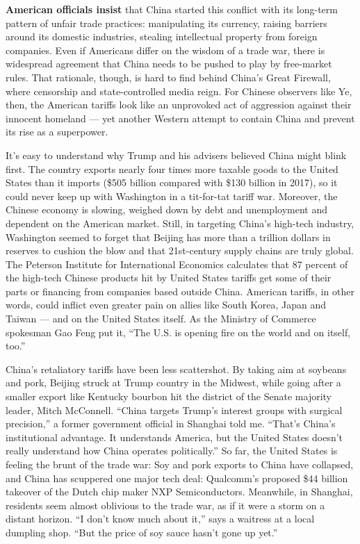\textbf{American officials insist} that China started this conflict with
its long-term pattern of unfair trade practices: manipulating its
currency, raising barriers around its domestic industries, stealing
intellectual property from foreign companies. Even if Americans differ
on the wisdom of a trade war, there is widespread agreement that China
needs to be pushed to play by free-market rules. That rationale, though,
is hard to find behind China's Great Firewall, where censorship and
state-controlled media reign. For Chinese observers like Ye, then, the
American tariffs look like an unprovoked act of aggression against their
innocent homeland --- yet another Western attempt to contain China and
prevent its rise as a superpower.

It's easy to understand why Trump and his advisers believed China might
blink first. The country exports nearly four times more taxable goods to
the United States than it imports (\$505 billion compared with \$130
billion in 2017), so it could never keep up with Washington in a
tit-for-tat tariff war. Moreover, the Chinese economy is slowing,
weighed down by debt and unemployment and dependent on the American
market. Still, in targeting China's high-tech industry, Washington
seemed to forget that Beijing has more than a trillion dollars in
reserves to cushion the blow and that 21st-century supply chains are
truly global. The Peterson Institute for International Economics
calculates that 87 percent of the high-tech Chinese products hit by
United States tariffs get some of their parts or financing from
companies based outside China. American tariffs, in other words, could
inflict even greater pain on allies like South Korea, Japan and Taiwan
--- and on the United States itself. As the Ministry of Commerce
spokesman Gao Feng put it, ``The U.S. is opening fire on the world and
on itself, too.''

China's retaliatory tariffs have been less scattershot. By taking aim at
soybeans and pork, Beijing struck at Trump country in the Midwest, while
going after a smaller export like Kentucky bourbon hit the district of
the Senate majority leader, Mitch McConnell. ``China targets Trump's
interest groups with surgical precision,'' a former government official
in Shanghai told me. ``That's China's institutional advantage. It
understands America, but the United States doesn't really understand how
China operates politically.'' So far, the United States is feeling the
brunt of the trade war: Soy and pork exports to China have collapsed,
and China has scuppered one major tech deal: Qualcomm's proposed \$44
billion takeover of the Dutch chip maker NXP Semiconductors. Meanwhile,
in Shanghai, residents seem almost oblivious to the trade war, as if it
were a storm on a distant horizon. ``I don't know much about it,'' says
a waitress at a local dumpling shop. ``But the price of soy sauce hasn't
gone up yet.''


